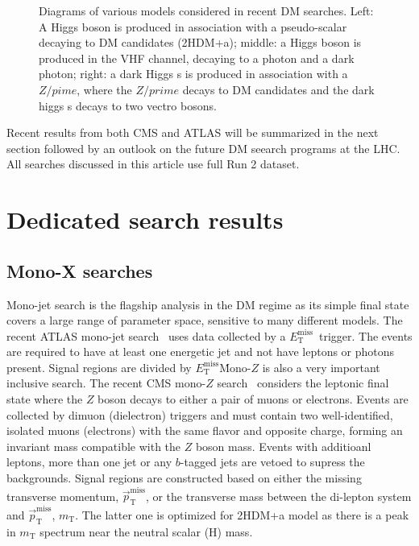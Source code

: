 \documentclass{moriond}
\def\mt{m_{\textrm{T}}}
\def\et{E_\textrm{T}^{\textrm{miss}}}
\def\ptmiss{\vec{p}_\textrm{T}^{\textrm{miss}}}
\begin{document}
\begin{figure} [htb]
\begin{minipage}{0.32\linewidth}
\end{minipage}
\caption[]{Diagrams of various models considered in recent DM searches. Left: A Higgs boson is produced in association with a pseudo-scalar decaying to DM candidates (2HDM+a); middle: a Higgs boson is produced in the VHF channel, decaying to a photon and a dark photon; right: a dark Higgs s is produced in association with a $Z/pime$, where the $Z/prime$ decays to DM candidates and the dark higgs s decays to two vectro bosons.}
\label{fig:diagrams}
\end{figure}

Recent results from both CMS and ATLAS will be summarized in the next section
followed by an outlook on the future DM seearch programs at the LHC. All
searches discussed in this article use full Run 2 dataset. 

\section{Dedicated search results}

\subsection{Mono-X searches}

Mono-jet search is the flagship analysis in the DM regime as its simple final
state covers a large range of parameter space, sensitive to many different
models. The recent ATLAS mono-jet search~\cite{monojet} uses data collected by a $\et$\
trigger. The events are required to have at least one energetic jet and not
have leptons or photons present. Signal regions are divided by $\et$\.

Mono-$Z$ is also a very important inclusive search. The recent CMS mono-$Z$
search~\cite{monoz} considers the leptonic final state where the $Z$ boson
decays to either a pair of muons or electrons. Events are collected by dimuon
(dielectron) triggers and must contain two well-identified, isolated muons
(electrons) with the same flavor and opposite charge, forming an invariant mass
compatible with the $Z$ boson mass. Events with additioanl leptons, more than
one jet or any $b$-tagged jets are vetoed to supress the backgrounds. Signal
regions are constructed based on either the missing transverse momentum,
$\ptmiss$, or the transverse mass between the di-lepton system and $\ptmiss$,
$\mt$. The latter one is optimized for 2HDM+a model as there is a peak in $\mt$
spectrum near the neutral scalar (H) mass. 
\end{document}
